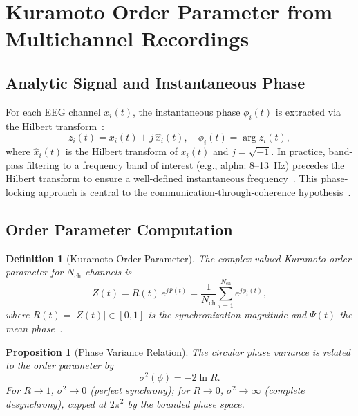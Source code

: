 \documentclass[11pt,twocolumn,a4paper]{article}
\newtheorem{proposition}[theorem]{Proposition}
\newtheorem{definition}[theorem]{Definition}
\begin{document}
\section{Kuramoto Order Parameter from Multichannel Recordings}
\label{sec:kuramoto}

\subsection{Analytic Signal and Instantaneous Phase}

For each EEG channel $x_i(t)$, the instantaneous phase $\phi_i(t)$ is extracted via the Hilbert transform~\cite{gabor1946,oppenheim1999}:
\begin{equation}
z_i(t) = x_i(t) + j\,\hat{x}_i(t), \quad \phi_i(t) = \arg z_i(t),
\label{eq:hilbert}
\end{equation}
where $\hat{x}_i(t)$ is the Hilbert transform of $x_i(t)$ and $j = \sqrt{-1}$.
In practice, band-pass filtering to a frequency band of interest (e.g., alpha: 8--13~Hz) precedes the Hilbert transform to ensure a well-defined instantaneous frequency~\cite{nunez2006,buzsaki2004}.
This phase-locking approach is central to the communication-through-coherence hypothesis~\cite{fries2015,varela2001}.

\subsection{Order Parameter Computation}

\begin{definition}[Kuramoto Order Parameter]
\label{def:kuramoto}
The complex-valued Kuramoto order parameter for $N_{\mathrm{ch}}$ channels is
\begin{equation}
Z(t) = R(t)\,e^{j\Psi(t)} = \frac{1}{N_{\mathrm{ch}}} \sum_{i=1}^{N_{\mathrm{ch}}} e^{j\phi_i(t)},
\label{eq:kuramoto-Z}
\end{equation}
where $R(t) = |Z(t)| \in [0,1]$ is the synchronization magnitude and $\Psi(t)$ the mean phase~\cite{kuramoto1975,lachaux1999}.
\end{definition}

\begin{proposition}[Phase Variance Relation]
\label{prop:variance}
The circular phase variance is related to the order parameter by
\begin{equation}
\sigma^2(\phi) = -2\ln R.
\label{eq:variance-R}
\end{equation}
For $R \to 1$, $\sigma^2 \to 0$ (perfect synchrony); for $R \to 0$, $\sigma^2 \to \infty$ (complete desynchrony), capped at $2\pi^2$ by the bounded phase space.
\end{proposition}
\end{document}
